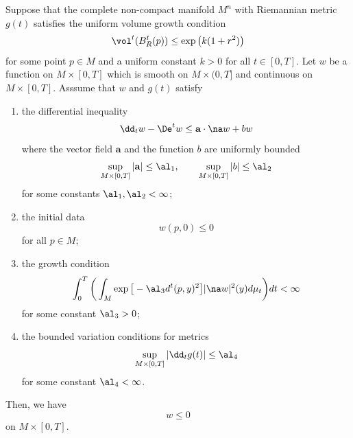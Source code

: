 \documentclass[hidelinks, 12pt, oneside, reqno]{amsart}
\begin{document}
\begin{thm}\label{theorem ecker huisken max}
    Suppose that the complete non-compact manifold $M^n$ with Riemannian metric $g(t)$ satisfies the uniform volume growth condition
    \begin{equation}\label{equation uniform volume growth}
        \vol^t(B^t_R(p)) \le \exp \big( k (1 + r^2) \big)
    \end{equation}
    for some point $p \in M$ and a uniform constant $k > 0$ for all $t \in [0,T]$. Let $w$ be a function on $M \times [0,T]$ which is smooth on $M \times (0,T]$ and continuous on $M \times [0,T]$. Asssume that $w$ and $g(t)$ satisfy
    \begin{enumerate}
        \item the differential inequality 
            \begin{equation}\label{equation ecker huisk diff ineq}
                \dd_t w - \De^t w \le \mathbf{a} \cdot \na w + b w
            \end{equation}
            where the vector field $\mathbf{a}$ and the function $b$ are uniformly bounded
            \begin{equation}\label{equation ecker huisk coeff bdd}
               \sup_{M \times [0,T]}|\mathbf{a}| \le \al_1, \qquad \sup_{M \times [0,T]}|b| \le \al_2
            \end{equation}
            for some constants $\al_1, \al_2 < \infty$;
        \item the initial data
            \begin{equation}\label{equation initial data negative}
                w(p,0) \le 0
            \end{equation}
            for all $p \in M$;
        \item the growth condition
            \begin{equation}\label{equation growth condition}
                \int_0^T \bigg( \int_M \exp \big[ -\al_3 d^t(p,y)^2\big]|\na w|^2(y)d\mu_t \bigg)dt< \infty
            \end{equation}
            for some constant $\al_3 >0$;
        \item the bounded variation conditions for metrics
            \begin{equation}\label{equation bounded metric variation condition}
                \sup_{M \times [0,T]} |\dd_t g(t)| \le \al_4
            \end{equation}
            for some constant $\al_4 < \infty$.
    \end{enumerate}
    Then, we have
    \[
    w \le 0
    \]
    on $M \times [0,T]$.
\end{thm}
\end{document}
